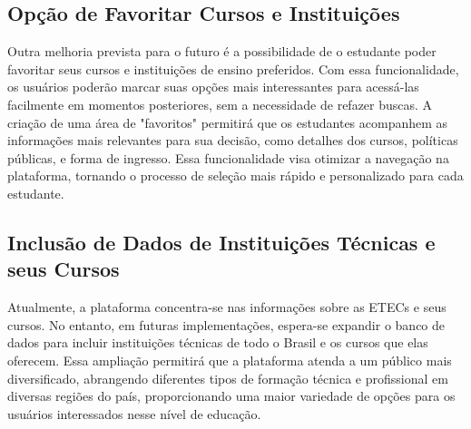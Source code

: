 \subsection{Opção de Favoritar Cursos e Instituições}
Outra melhoria prevista para o futuro é a possibilidade de o estudante poder favoritar seus cursos e instituições de ensino preferidos. Com essa funcionalidade, os usuários poderão marcar suas opções mais interessantes para acessá-las facilmente em momentos posteriores, sem a necessidade de refazer buscas. A criação de uma área de "favoritos" permitirá que os estudantes acompanhem as informações mais relevantes para sua decisão, como detalhes dos cursos, políticas públicas, e forma de ingresso. Essa funcionalidade visa otimizar a navegação na plataforma, tornando o processo de seleção mais rápido e personalizado para cada estudante.

\subsection{Inclusão de Dados de Instituições Técnicas e seus Cursos}
Atualmente, a plataforma concentra-se nas informações sobre as ETECs e seus cursos. No entanto, em futuras implementações, espera-se expandir o banco de dados para incluir instituições técnicas de todo o Brasil e os cursos que elas oferecem. Essa ampliação permitirá que a plataforma atenda a um público mais diversificado, abrangendo diferentes tipos de formação técnica e profissional em diversas regiões do país, proporcionando uma maior variedade de opções para os usuários interessados nesse nível de educação.

